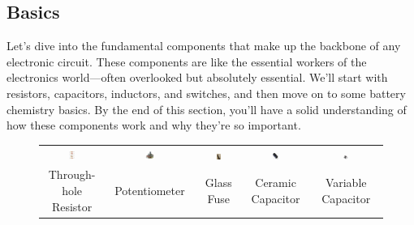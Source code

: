 \subsection{Basics}
\label{subsec:basics-passive}

Let's dive into the fundamental components that make up the backbone of any electronic circuit. These components are like the essential workers of the electronics world—often overlooked but absolutely essential. We'll start with resistors, capacitors, inductors, and switches, and then move on to some battery chemistry basics. By the end of this section, you'll have a solid understanding of how these components work and why they're so important.



\begin{figure}[h!]
    \centering
    \footnotesize
    \begin{tabular}{ccccc}
        \includegraphics[width=0.11\textwidth]{tech/images/resistor} &
        \includegraphics[width=0.11\textwidth]{tech/images/potentiometer} &
        \includegraphics[width=0.11\textwidth]{tech/images/fuse} &
        \includegraphics[width=0.11\textwidth]{tech/images/capacitor} &
        \includegraphics[width=0.11\textwidth]{tech/images/variable-capacitor} \\
        Through-hole Resistor & Potentiometer & Glass Fuse & Ceramic Capacitor & Variable Capacitor \\[2em]

\end{tabular}
\end{figure}
